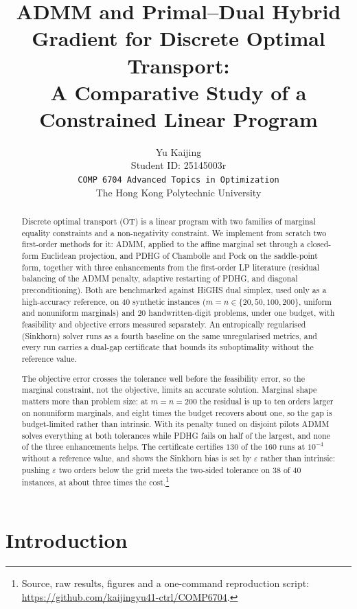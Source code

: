 \documentclass{article}
\title{ADMM and Primal--Dual Hybrid Gradient for Discrete Optimal Transport:\\ A Comparative Study of a Constrained Linear Program}
\author{%
  Yu Kaijing \\
  Student ID: 25145003r \\
  \texttt{COMP 6704 Advanced Topics in Optimization} \\
  The Hong Kong Polytechnic University
}
\newcommand{\Tol}[1]{10^{-#1}}
\begin{document}
\maketitle

\begin{abstract}
Discrete optimal transport (OT) is a linear program with two families of marginal
equality constraints and a non-negativity constraint. We implement from scratch two
first-order methods for it: ADMM, applied to the affine marginal set through a
closed-form Euclidean projection, and PDHG of Chambolle and Pock on the saddle-point
form, together with three enhancements from the first-order LP literature (residual
balancing of the ADMM penalty, adaptive restarting of PDHG, and diagonal
preconditioning). Both are benchmarked against HiGHS dual simplex, used only as a
high-accuracy reference, on 40 synthetic instances
($m=n\in\{20,50,100,200\}$, uniform and nonuniform marginals) and 20 handwritten-digit
problems, under one budget, with feasibility and objective errors measured separately.
An entropically regularised (Sinkhorn) solver runs as a fourth baseline on the same
unregularised metrics, and every run carries a dual-gap certificate that bounds its
suboptimality without the reference value.

The objective error crosses the tolerance well before the feasibility error, so the marginal
constraint, not the objective, limits an accurate solution. Marginal shape matters more than
problem size: at $m=n=200$ the residual is up to ten orders larger on nonuniform marginals,
and eight times the budget recovers about one, so the gap is budget-limited rather than
intrinsic. With its penalty tuned on disjoint pilots ADMM solves everything at both
tolerances while PDHG fails on half of the largest, and none of the three enhancements helps.
The certificate certifies $130$ of the $160$ runs at $\Tol{4}$ without a reference value, and
shows the Sinkhorn bias is set by $\varepsilon$ rather than intrinsic: pushing $\varepsilon$
two orders below the grid meets the two-sided tolerance on $38$ of $40$ instances, at about
three times the cost.\footnote{Source, raw results, figures and a one-command
reproduction script: \url{https://github.com/kaijingyu41-ctrl/COMP6704}.}
\end{abstract}

\section{Introduction}
\end{document}
